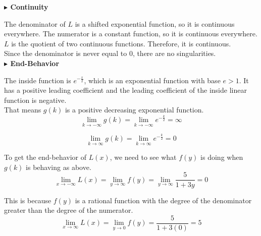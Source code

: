 \documentclass{ximera}
\begin{document}
\begin{example}
\textbf{\textcolor{blue!55!black}{$\blacktriangleright$ Continuity}} 


The denominator of $L$ is a shifted exponential function, so it is continuous everywhere. The numerator is a constant function, so it is continuous everywhere.  $L$ is the quotient of two continuous functions.  Therefore, it is continuous. \\


Since the denominator is never equal to $0$, there are no singularities. \\














\textbf{\textcolor{blue!55!black}{$\blacktriangleright$ End-Behavior}} 


The inside function is $e^{-\tfrac{x}{2}}$, which is an exponential function with base $e > 1$.  It has a positive leading coefficient and the leading coefficient of the inside linear function is negative. \\

That means $g(k)$ is a positive decreasing exponential function. \\



\[  
\lim\limits_{k \to -\infty}g(k) = \lim\limits_{k \to -\infty}e^{-\tfrac{k}{2}} = \infty
\]




\[  
\lim\limits_{k \to \infty}g(k) = \lim\limits_{k \to \infty}e^{-\tfrac{k}{2}} = 0
\]




To get the end-behavior of $L(x)$, we need to see what $f(y)$ is doing when $g(k)$ is behaving as above. \\





\[  
\lim\limits_{x \to -\infty}L(x) = \lim\limits_{y \to \infty}f(y) = \lim\limits_{y \to \infty}\frac{5}{1 + 3 y} = 0
\]

This is because $f(y)$ is a rational function with the degree of the denominator greater than the degree of the numerator. \\






\[  
\lim\limits_{x \to \infty}L(x) = \lim\limits_{y \to 0}f(y) = \frac{5}{1 + 3 (0)} = 5
\]




\end{example}
\end{document}
